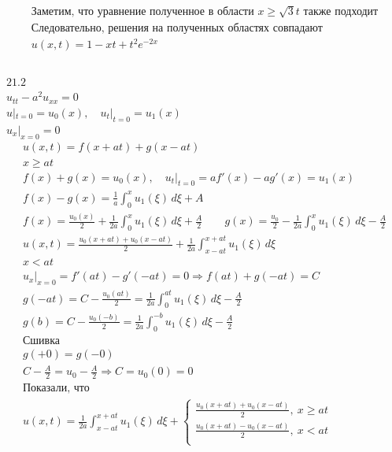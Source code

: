 \begin{enumerate}
\begin{gather*}
    \text{Заметим, что уравнение полученное в области $x \geq \sqrt{3}t$ также подходит} \\
    \text{Следовательно, решения на полученных областях совпадают} \\
    \boxed{u(x,t)=1-xt+t^{2}e^{-2x}}\\
    \end{gather*} \\
    $21.2$ \\
    $u_{tt}-a^{2}u_{xx}=0$ \\
    $u|_{t=0}=u_{0}(x), \quad u_{t}|_{t=0} = u_{1}(x)$ \\
    $u_{x}|_{x=0}=0$ \\
    \begin{gather*}
      u(x,t)=f(x+at)+g(x-at) \\
      x \geq at \\
      f(x)+g(x)=u_{0}(x), \quad u_{t}|_{t=0}=af'(x)-ag'(x)=u_{1}(x) \\
      f(x)-g(x)= \frac{1}{a}\int_{0}^{x} u_{1}(\xi) \,d\xi+A \\
      f(x)= \frac{u_{0}(x)}{2}+ \frac{1}{2a}\int_{0}^{x} u_{1}(\xi) \,d\xi+\frac{A}{2} \qquad
      g(x)= \frac{u_{0}}{2}- \frac{1}{2a}\int_{0}^{x} u_{1}(\xi) \,d\xi-\frac{A}{2} \\
 \boxed{ u(x,t) = \frac{u_{0}(x+at)+u_{0}(x-at)}{2}+\frac{1}{2a}
 \int_{x-at}^{x+at} u_{1}(\xi) \,d\xi} \\
    x<at \\
    u_{x}|_{x=0} = f'(at)-g'(-at)=0 \Rightarrow f(at)+g(-at)=C \\
    g(-at)=C- \frac{u_{0}(at)}{2}=\frac{1}{2a}\int_{0}^{at} u_{1}(\xi) \,d\xi-\frac{A}{2} \\
    g(b)=C- \frac{u_{0}(-b)}{2}=\frac{1}{2a}\int_{0}^{-b} u_{1}(\xi) \,d\xi-\frac{A}{2} \\
    \text{Сшивка} \\
    g(+0)=g(-0) \\
    C-\frac{A}{2}=u_{0}-\frac{A}{2} \Rightarrow C = u_{0}(0)=0 \\
    \text{Показали, что} \\
    \boxed{u(x,t)= \frac{1}{2a}\int_{x-at}^{x+at} u_{1}(\xi) \,d\xi + \begin{cases}
      \frac{u_{0}(x+at)+u_{0}(x-at)}{2}, \ x \geq at \\
      \frac{u_{0}(x+at)-u_{0}(x-at)}{2}, \ x < at \\
  \end{cases}}
    \end{gather*} \\

\end{enumerate}
